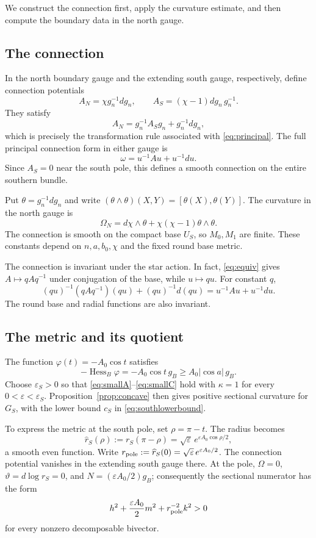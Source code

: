 \documentclass[12pt]{amsart}
\numberwithin{equation}{section}
\theoremstyle{remark}
\newcommand{\eps}{\varepsilon}
\newcommand{\Hess}{\operatorname{Hess}}
\begin{document}
We construct the connection first, apply the curvature estimate, and
then compute the boundary data in the north gauge.

\subsection{The connection}
In the north boundary gauge and the extending south gauge, respectively,
define connection potentials
\begin{equation}\label{eq:potentials}
A_N=\chi g_n^{-1}dg_n,\qquad
A_S=(\chi-1)dg_n\,g_n^{-1}.
\end{equation}
They satisfy
\[
A_N=g_n^{-1}A_Sg_n+g_n^{-1}dg_n,
\]
which is precisely the transformation rule associated with
\eqref{eq:principal}. The full principal connection form in either
gauge is
\begin{equation}\label{eq:omega}
\omega=u^{-1}Au+u^{-1}du.
\end{equation}
Since \(A_S=0\) near the south pole, this defines a smooth connection
on the entire southern bundle.

Put \(\theta=g_n^{-1}dg_n\) and write
\((\theta\wedge\theta)(X,Y)=[\theta(X),\theta(Y)]\). The curvature
in the north gauge is
\[
\Omega_N=d\chi\wedge\theta+
                     \chi(\chi-1)\theta\wedge\theta.
\]
The connection is smooth on the compact base \(U_S\), so
\(M_0,M_1\) are finite. These constants depend on \(n,a,b_0,\chi\)
and the fixed round base metric.

The connection is invariant under the star action. In fact,
\eqref{eq:equiv} gives \(A\mapsto qAq^{-1}\) under conjugation of
the base, while \(u\mapsto qu\). For constant \(q\),
\[
(qu)^{-1}(qAq^{-1})(qu)+(qu)^{-1}d(qu)
                   =u^{-1}Au+u^{-1}du.
\]
The round base and radial functions are also invariant.

\subsection{The metric and its quotient}
The function \(\varphi(t)=-A_0\cos t\) satisfies
\[
-\Hess_B\varphi=-A_0\cos t\,g_B
                         \ge A_0|\cos a|\,g_B.
\]
Choose \(\eps_S>0\) so that \eqref{eq:smallA}--\eqref{eq:smallC}
hold with \(\kappa=1\) for every \(0<\eps<\eps_S\).
Proposition~\ref{prop:concave} then gives positive sectional curvature
for \(G_S\), with the lower bound \(c_S\) in
\eqref{eq:southlowerbound}.

To express the metric at the south pole, set \(\rho=\pi-t\).
The radius becomes
\[
 \widehat r_S(\rho):=r_S(\pi-\rho)
          =\sqrt\eps\,e^{\eps A_0\cos\rho/2},
\]
a smooth even function. Write
\(r_{\rm pole}:=\widehat r_S(0)=\sqrt\eps\,e^{\eps A_0/2}\).
The connection potential vanishes in the extending south gauge there. At the pole,
\(\Omega=0\), \(\vartheta=d\log r_S=0\), and
\(N=(\eps A_0/2)g_B\); consequently the sectional numerator has
the form
\[
h^2+\frac{\eps A_0}{2}m^2+r_{\rm pole}^{-2}k^2>0
\]
for every nonzero decomposable bivector.
\end{document}
